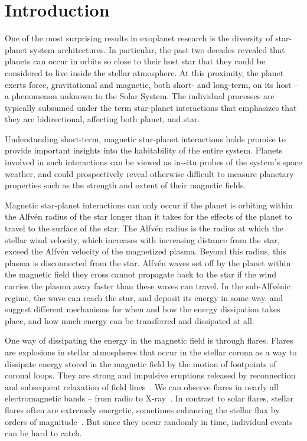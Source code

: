 \documentclass[twocolumn]{aastex631}
\begin{document}
\section{Introduction}
\label{sec:intro}
One of the most surprising results in exoplanet research is the diversity of star-planet system architectures. In particular, the past two decades revealed that planets can occur in orbits so close to their host star that they could be considered to live inside the stellar atmosphere. At this proximity, the planet exerts force, gravitational and magnetic, both short- and long-term, on its host -- a phenomenon unknown to the Solar System. The individual processes are typically subsumed under the term star-planet interactions that emphasizes that they are bidirectional, affecting both planet, and star. 

Understanding short-term, magnetic star-planet interactions holds promise to provide important insights into the habitability of the entire system. Planets involved in such interactions can be viewed as in-situ probes of the system's space weather, and could prospectively reveal otherwise difficult to measure planetary properties such as the strength and extent of their magnetic fields.

Magnetic star-planet interactions can only occur if the planet is orbiting within the Alfv\'en radius of the star longer than it takes for the effects of the planet to travel to the surface of the star. The Alfv\'en radius is the radius at which the stellar wind velocity, which increases with increasing distance from the star, exceed the Alfv\'en velocity of the magnetized plasma. Beyond this radius, this plasma is disconnected from the star. Alfv\'en waves set off by the planet within the magnetic field they cross cannot propagate back to the star if the wind carries the plasma away faster than these waves can travel. In the sub-Alfv\'enic regime, the wave can reach the star, and deposit its energy in some way. \citet{lanza2012starplanet, lanza2018closeby} and \citet{zarka2007plasma, saur2013magnetic} suggest different mechanisms for when and how the energy dissipation takes place, and how much energy can be transferred and dissipated at all. 

One way of dissipating the energy in the magnetic field is through flares. 
Flares are explosions in stellar atmospheres that occur in the stellar corona as a way to dissipate energy stored in the magnetic field by the motion of footpoints of coronal loops. They are strong and impulsive eruptions released by reconnection and subsequent relaxation of field lines~\citep{svestka1976solar,priest2002magnetic}. We can observe flares in nearly all electromagnetic bands -- from radio to X-ray~\citep{benz2010physical}. In contrast to solar flares, stellar flares often are extremely energetic, sometimes enhancing the stellar flux by orders of magnitude~\citep{maehara2012superflares, shibayama2013superflares, paudel2018k2}. But since they occur randomly in time, individual events can be hard to catch.
\end{document}
